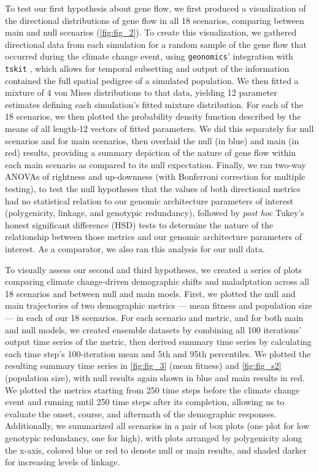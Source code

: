 \documentclass[9pt,twocolumn,twoside,lineno]{pnas-new}
\begin{document}
{To test our first hypothesis about gene flow,
we first produced a visualization of the directional 
distributions of gene flow in all 18 scenarios, comparing between main
and null scenarios (\ref{fig:fig_2}).
To create this visualization, we gathered directional data
from each simulation for a random 
sample of the gene flow that occurred during the climate change event, using 
\texttt{geonomics}' integration with \texttt{tskit} \cite{kelleher}, which allows for temporal 
subsetting and output of the information contained the full spatial pedigree of a 
simulated population. We then fitted a mixture of 4 von Mises distributions to that data, 
yielding 12 parameter estimates defining each simulation's fitted mixture distribution. For each of 
the 18 scenarios, we then plotted the probability density function 
described by the means of all length-12 vectors of fitted parameters. We did this 
separately for null scenarios and for main scenarios, then overlaid the null (in blue)
and main (in red) results, providing a summary depiction of the nature of gene flow within each 
main scenario as compared to its null expectation.
Finally, we ran two-way ANOVAs of 
rightness and up-downness (with Bonferroni correction for multiple testing), 
to test the null hypotheses that the values of both directional metrics
had no statistical relation to our genomic architecture parameters
of interest (polygenicity, linkage, and genotypic redundancy),
followed by \textit{post hoc} Tukey's honest significant difference (HSD) tests
to determine the nature of the relationship between those metrics and our
genomic architecture parameters of interest.
As a comparator, we also ran this analysis for our null data.

To visually assess our second and third hypotheses, we created a series of
plots comparing climate change-driven demographic shifts
and maladptation across all 18 scenarios and between null and main moels.
First, we plotted the 
null and main trajectories of two demographic
metrics --- mean fitness and population size --- in 
each of our 18 scenarios. For each scenario and metric, and 
for both main and null models, we created ensemble datasets by combining all 100 
iterations’ output time series of the metric,
then derived summary time series by calculating each time step's
100-iteration mean and 5th and 95th percentiles.
We plotted the resulting summary time series in \ref{fig:fig_3} (mean fitness)
and \ref{fig:fig_s2} (population size), with null results again shown in blue
and main results in red.
We plotted the metrics starting from 250 time steps before the climate change event
and running until 250 time steps after its completion, allowing us
to evaluate the onset, course, and aftermath of the demographic responses.
Additionally, we summarized all scenarios in a pair of box plots
(one plot for low genotypic redundancy, one for high),
with plots arranged by polygenicity along the x-axis,
colored blue or red to denote null or main results,
and shaded darker for increasing levels of linkage.

}
\end{document}
